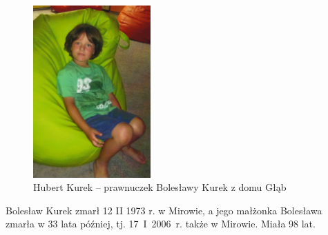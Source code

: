\begin{figure}[!h]
\begin{center}
\includegraphics[width=0.4\textwidth]{zdjecia/hubert_kurek.jpg}
\caption[Hubert Kurek]{Hubert Kurek -- prawnuczek Bolesławy Kurek z domu Głąb}
\label{rys:hubert_kurek}
\end{center}
\end{figure}

Bolesław Kurek zmarł 12 II 1973 r. w Mirowie, a jego małżonka Bolesława zmarła w 33 lata później, tj. 17~I~2006~r. także w Mirowie. Miała 98 lat.



